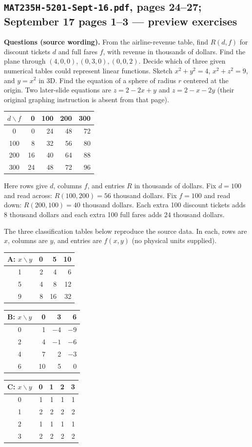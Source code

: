 \subsection{\texttt{MAT235H-5201-Sept-16.pdf}, pages 24--27; September 17 pages 1--3 --- preview exercises}
\textbf{Questions (source wording).} From the airline-revenue table, find $R(d,f)$ for discount tickets $d$ and full fares $f$, with revenue in thousands of dollars. Find the plane through $(4,0,0),(0,3,0),(0,0,2)$. Decide which of three given numerical tables could represent linear functions. Sketch $x^2+y^2=4$, $x^2+z^2=9$, and $y=x^2$ in 3D. Find the equation of a sphere of radius $r$ centered at the origin. Two later-slide equations are $z=2-2x+y$ and $z=2-x-2y$ (their original graphing instruction is absent from that page).\par
\begin{center}\small\begin{tabular}{c|rrrr}\toprule $d\backslash f$&0&100&200&300\\\midrule0&0&24&48&72\\100&8&32&56&80\\200&16&40&64&88\\300&24&48&72&96\\\bottomrule\end{tabular}\end{center}
Here rows give $d$, columns $f$, and entries $R$ in thousands of dollars. Fix $d=100$ and read across: $R(100,200)=56$ thousand dollars. Fix $f=100$ and read down: $R(200,100)=40$ thousand dollars. Each extra 100 discount tickets adds $8$ thousand dollars and each extra 100 full fares adds $24$ thousand dollars.\par
The three classification tables below reproduce the source data. In each, rows are $x$, columns are $y$, and entries are $f(x,y)$ (no physical units supplied).
\begin{center}\small
\begin{tabular}{c|rrr}\toprule A: $x\backslash y$&0&5&10\\\midrule1&2&4&6\\5&4&8&12\\9&8&16&32\\\bottomrule\end{tabular}\quad
\begin{tabular}{c|rrr}\toprule B: $x\backslash y$&0&3&6\\\midrule0&1&$-4$&$-9$\\2&4&$-1$&$-6$\\4&7&2&$-3$\\6&10&5&0\\\bottomrule\end{tabular}\quad
\begin{tabular}{c|rrrr}\toprule C: $x\backslash y$&0&1&2&3\\\midrule0&1&1&1&1\\1&2&2&2&2\\2&1&1&1&1\\3&2&2&2&2\\\bottomrule\end{tabular}
\end{center}
